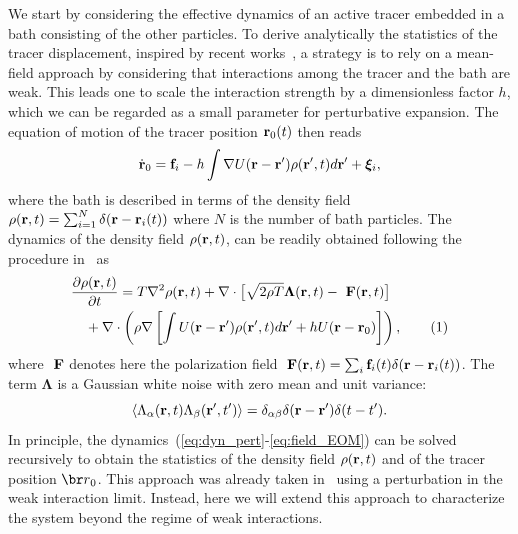 \documentclass[superscriptaddress, twocolumn, prl, longbibliography, nofootinbib]{revtex4-1}
\newcommand{\F}{\text{ \bf F}}
\newcommand{\T}{T}
\newcommand{\U}{U}
\newcommand\numberthis{\addtocounter{equation}{1}\tag{\theequation}}
\begin{document}
We start by considering the effective dynamics of an active tracer embedded in a bath consisting of the other particles. To derive analytically the statistics of the tracer displacement, inspired by recent works~\cite{Demery2011, Demery2014}, a strategy is to rely on a mean-field approach by considering that interactions among the tracer and the bath are weak. This leads one to scale the interaction strength by a dimensionless factor $h$, which we can be regarded as a small parameter for perturbative expansion. The equation of motion of the tracer position ${\bf r}_0(t)$ then reads
\begin{equation}\label{eq:dyn_pert}
\dot{\bf r}_0 = {\bf f}_i - h \int  \nabla \U({\bf r}  - {\bf r}') \rho ({\bf r}', t)  d {\bf r}' + {\bm \xi}_i ,
\end{equation}
where the bath is described in terms of the density field $\rho ( {\bf r} , t) = \sum_{i=1}^N \delta({\bf r} - {\bf r}_i(t))$ where $N$ is the number of bath particles. The dynamics of the density field $\rho({\bf r} , t)$, can be readily obtained following the procedure in~\cite{Dean_1996} as
\begin{align*}\label{eq:field_EOM}
    &\dfrac{\partial \rho ({\bf r}, t)}{ \partial t} = \T \nabla^2 \rho({\bf r}, t) + \nabla \cdot \big[ \sqrt{2 \rho \T} {\bm \Lambda}({\bf r}, t) -\F({\bf r}, t) \big] 
    \\
    &\quad + \nabla \cdot \left( \rho \nabla \left[ \int  \U({\bf r}  - {\bf r}') \rho({\bf r}', t)  d {\bf r}' +  h\U({\bf r} - {\bf r}_0)  \right] \right) , \numberthis
\end{align*}
where $\F$ denotes here the polarization field $ \F ({\bf r}, t) = \sum_i {\bf f}_i(t) \delta({\bf r} - {\bf r}_i(t))$. The term $\boldsymbol\Lambda$ is a Gaussian white noise with zero mean and unit variance:
\begin{equation}\label{eq:field_noise}
     \langle \Lambda_{\alpha} ({\bf r}, t) \Lambda_{\beta} ({\bf r}', t') \rangle = \delta_{\alpha \beta} \delta({\bf r} - {\bf r}') \delta(t - t')  .
\end{equation}
In principle, the dynamics~(\ref{eq:dyn_pert}-\ref{eq:field_EOM}) can be solved recursively to obtain the statistics of the density field $\rho({\bf r} , t)$ and of the tracer position ${\br r}_0$. This approach was already taken in~\cite{Suri2019, Suri2020} using a perturbation in the weak interaction limit. Instead, here we will extend this approach to characterize the system beyond the regime of weak interactions.
\end{document}
